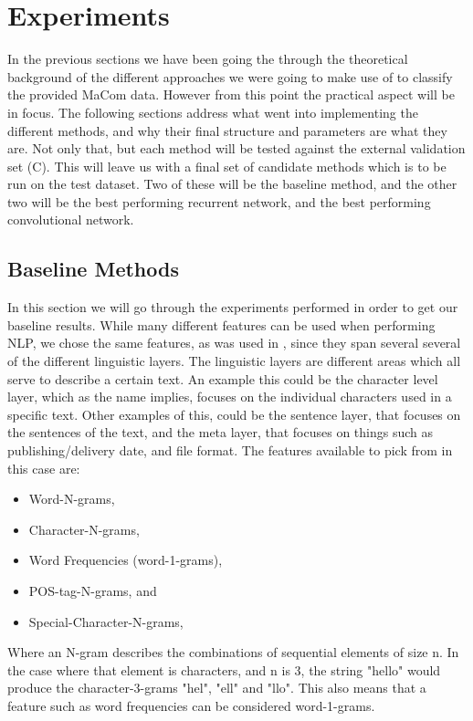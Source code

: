 \section{Experiments} \label{sec:experiments} 
In the previous sections we have been going the through the theoretical
background of the different approaches we were going to make use of to classify
the provided MaCom data. However from this point the practical aspect will be in
focus. The following sections address what went into implementing the different
methods, and why their final structure and parameters are what they are. Not
only that, but each method will be tested against the external validation set
(C). This will leave us with a final set of candidate methods which is to be run
on the test dataset. Two of these will be the baseline method, and the other
two will be the best performing recurrent network, and the best performing
convolutional network.

\subsection{Baseline Methods} \label{subsec:baseline}

In this section we will go through the experiments performed in order to get
our baseline results. While many different features can be used when performing
\gls{NLP}, we chose the same features, as was used in \citet{US}, since they
span several several of the different linguistic layers. The linguistic layers
are different areas which all serve to describe a certain text. An example this
could be the character level layer, which as the name implies, focuses on the
individual characters used in a specific text. Other examples of this, could
be the sentence layer, that focuses on the sentences of the text, and the meta
layer, that focuses on things such as publishing/delivery date, and file format.
The features available to pick from in this case are:

\begin{itemize}
    \item Word-N-grams,
    \item Character-N-grams,
    \item Word Frequencies (word-1-grams),
    \item \gls{POS}-tag-N-grams, and
    \item Special-Character-N-grams,
\end{itemize}

Where an N-gram describes the combinations of sequential elements of size n. In
the case where that element is characters, and n is 3, the string "hello" would
produce the character-3-grams "hel", "ell" and "llo". This also means that a
feature such as word frequencies can be considered word-1-grams.

